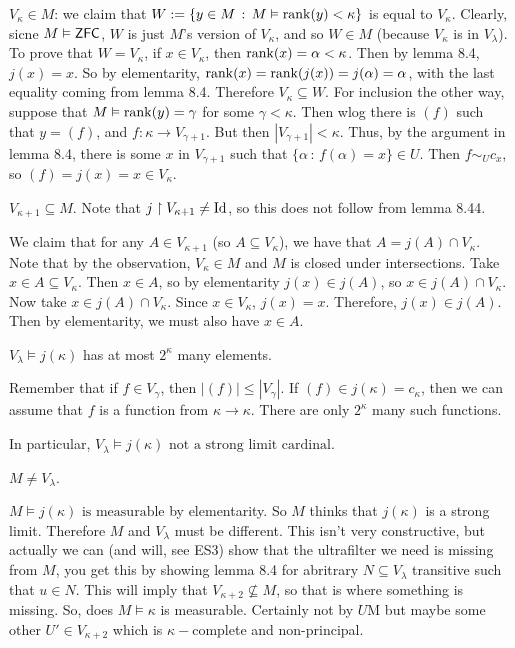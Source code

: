\documentclass{article}
\begin{document}
$V_{\kappa} \in M$: we claim that $W := \{ y \in M\, : \, M \vDash \rank(y) < \kappa\}$ is equal to $V_{\kappa}$. Clearly, sicne $M \vDash \mathsf{ZFC}$, $W$ is just $M$'s version of $V_{\kappa}$, and so $W \in M$ (because $V_{\kappa}$ is in $V_{\lambda}$). \gap 
To prove that $W = V_{\kappa}$, if $x \in V_{\kappa}$, then $\rank(x) = \alpha < \kappa$. Then by lemma 8.4, $j(x)=x$. So by elementarity, $\rank(x)=\rank(j(x))=j(\alpha)=\alpha$, with the last equality coming from lemma 8.4. Therefore $V_{\kappa} \subseteq W$. \gap 
For inclusion the other way, suppose that $M \vDash \rank(y)=\gamma$ for some $\gamma < \kappa$. Then wlog there is $(f)$ such that $y=(f)$, and $f: \kappa \to V_{\gamma+1}$. But then $|V_{\gamma+1}|<\kappa$. Thus, by the argument in lemma 8.4, there is some $x$ in $V_{\gamma+1}$ such that $\{\alpha \, : \, f(\alpha)=x\} \in U$. Then $f \sim_{U} c_{x}$, so $(f)=j(x)=x \in V_{\kappa}$. \endproof 
\begin{fancylem}{}
    $V_{\kappa+1} \subseteq M$. Note that $j \upharpoonright V_{\kappa+1} \neq \operatorname{Id}$, so this does not follow from lemma 8.44.
\end{fancylem}
\proof We claim that for any $A \in V_{\kappa+1}$ (so $A \subseteq V_{\kappa}$), we have that $A = j(A) \cap V_{\kappa}$. Note that by the observation, $V_{\kappa} \in M$ and $M$ is closed under intersections. \gap 
Take $x \in A \subseteq V_{\kappa}$. Then $x \in A$, so by elementarity $j(x) \in j(A)$, so $x \in j(A) \cap V_{\kappa}$.\gap 
Now take $x \in j(A) \cap V_{\kappa}$. Since $x \in V_{\kappa}$, $j(x)=x$. Therefore, $j(x) \in j(A)$. Then by elementarity, we must also have $x \in A$. \endproof 
\begin{fancylem}{}
    $V_{\lambda} \models j(\kappa)$ has at most $2^{\kappa}$ many elements.
\end{fancylem}
\proof Remember that if $f \in V_{\gamma}$, then $|(f)| \leq |V_{\gamma}|$. If $(f) \in j(\kappa) = c_{\kappa}$, then we can assume that $f$ is a function from $\kappa \to \kappa$. There are only $2^{\kappa}$ many such functions. \endproof 

In particular, $V_{\lambda} \models j(\kappa) \text{ not a strong limit cardinal}$.
\begin{fancylem}{}
    $M \neq V_{\lambda}$.
\end{fancylem}
\proof $M \models j(\kappa) \text{ is measurable}$ by elementarity. So $M$ thinks that $j(\kappa)$ is a strong limit. Therefore $M$ and $V_{\lambda}$ must be different. \endproof
This isn't very constructive, but actually we can (and will, see ES3) show that the ultrafilter we need is missing from $M$, you get this by showing lemma 8.4 for abritrary $N \subseteq V_{\lambda}$ transitive such that $u \in N$. This will imply that $V_{\kappa+2} \nsubseteq M$, so that is where something is missing.\gap 
\newlec
So, does $M \models \kappa$ is measurable. Certainly not by $U$M but maybe some other $U' \in V_{\kappa+2}$ which is $\kappa-$complete and non-principal.
\end{document}
